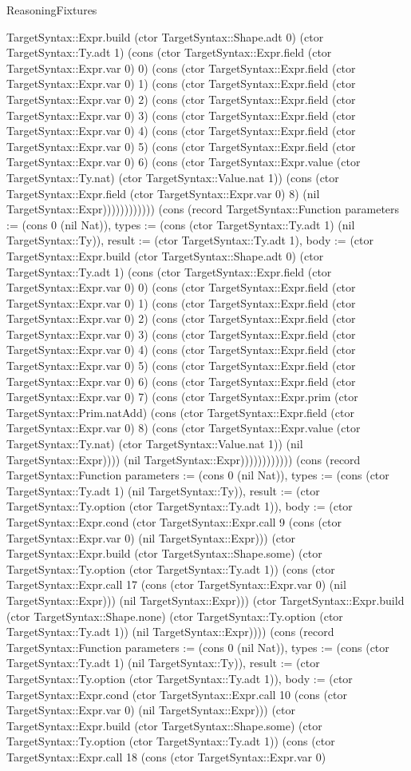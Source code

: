 \begin{lexlean}{ReasoningFixtures}
\begin{semanticmodule}
{TargetSyntax::Expr.build (ctor TargetSyntax::Shape.adt 0) (ctor TargetSyntax::Ty.adt 1) (cons (ctor TargetSyntax::Expr.field (ctor TargetSyntax::Expr.var 0) 0) (cons (ctor TargetSyntax::Expr.field (ctor TargetSyntax::Expr.var 0) 1) (cons (ctor TargetSyntax::Expr.field (ctor TargetSyntax::Expr.var 0) 2) (cons (ctor TargetSyntax::Expr.field (ctor TargetSyntax::Expr.var 0) 3) (cons (ctor TargetSyntax::Expr.field (ctor TargetSyntax::Expr.var 0) 4) (cons (ctor TargetSyntax::Expr.field (ctor TargetSyntax::Expr.var 0) 5) (cons (ctor TargetSyntax::Expr.field (ctor TargetSyntax::Expr.var 0) 6) (cons (ctor TargetSyntax::Expr.value (ctor TargetSyntax::Ty.nat) (ctor TargetSyntax::Value.nat 1)) (cons (ctor TargetSyntax::Expr.field (ctor TargetSyntax::Expr.var 0) 8) (nil TargetSyntax::Expr)))))))))))}) (cons (record TargetSyntax::Function {parameters := (cons 0 (nil Nat)), types := (cons (ctor TargetSyntax::Ty.adt 1) (nil TargetSyntax::Ty)), result := (ctor TargetSyntax::Ty.adt 1), body := (ctor TargetSyntax::Expr.build (ctor TargetSyntax::Shape.adt 0) (ctor TargetSyntax::Ty.adt 1) (cons (ctor TargetSyntax::Expr.field (ctor TargetSyntax::Expr.var 0) 0) (cons (ctor TargetSyntax::Expr.field (ctor TargetSyntax::Expr.var 0) 1) (cons (ctor TargetSyntax::Expr.field (ctor TargetSyntax::Expr.var 0) 2) (cons (ctor TargetSyntax::Expr.field (ctor TargetSyntax::Expr.var 0) 3) (cons (ctor TargetSyntax::Expr.field (ctor TargetSyntax::Expr.var 0) 4) (cons (ctor TargetSyntax::Expr.field (ctor TargetSyntax::Expr.var 0) 5) (cons (ctor TargetSyntax::Expr.field (ctor TargetSyntax::Expr.var 0) 6) (cons (ctor TargetSyntax::Expr.field (ctor TargetSyntax::Expr.var 0) 7) (cons (ctor TargetSyntax::Expr.prim (ctor TargetSyntax::Prim.natAdd) (cons (ctor TargetSyntax::Expr.field (ctor TargetSyntax::Expr.var 0) 8) (cons (ctor TargetSyntax::Expr.value (ctor TargetSyntax::Ty.nat) (ctor TargetSyntax::Value.nat 1)) (nil TargetSyntax::Expr)))) (nil TargetSyntax::Expr)))))))))))}) (cons (record TargetSyntax::Function {parameters := (cons 0 (nil Nat)), types := (cons (ctor TargetSyntax::Ty.adt 1) (nil TargetSyntax::Ty)), result := (ctor TargetSyntax::Ty.option (ctor TargetSyntax::Ty.adt 1)), body := (ctor TargetSyntax::Expr.cond (ctor TargetSyntax::Expr.call 9 (cons (ctor TargetSyntax::Expr.var 0) (nil TargetSyntax::Expr))) (ctor TargetSyntax::Expr.build (ctor TargetSyntax::Shape.some) (ctor TargetSyntax::Ty.option (ctor TargetSyntax::Ty.adt 1)) (cons (ctor TargetSyntax::Expr.call 17 (cons (ctor TargetSyntax::Expr.var 0) (nil TargetSyntax::Expr))) (nil TargetSyntax::Expr))) (ctor TargetSyntax::Expr.build (ctor TargetSyntax::Shape.none) (ctor TargetSyntax::Ty.option (ctor TargetSyntax::Ty.adt 1)) (nil TargetSyntax::Expr)))}) (cons (record TargetSyntax::Function {parameters := (cons 0 (nil Nat)), types := (cons (ctor TargetSyntax::Ty.adt 1) (nil TargetSyntax::Ty)), result := (ctor TargetSyntax::Ty.option (ctor TargetSyntax::Ty.adt 1)), body := (ctor TargetSyntax::Expr.cond (ctor TargetSyntax::Expr.call 10 (cons (ctor TargetSyntax::Expr.var 0) (nil TargetSyntax::Expr))) (ctor TargetSyntax::Expr.build (ctor TargetSyntax::Shape.some) (ctor TargetSyntax::Ty.option (ctor TargetSyntax::Ty.adt 1)) (cons (ctor TargetSyntax::Expr.call 18 (cons (ctor TargetSyntax::Expr.var 0) }
\end{semanticmodule}
\end{lexlean}
